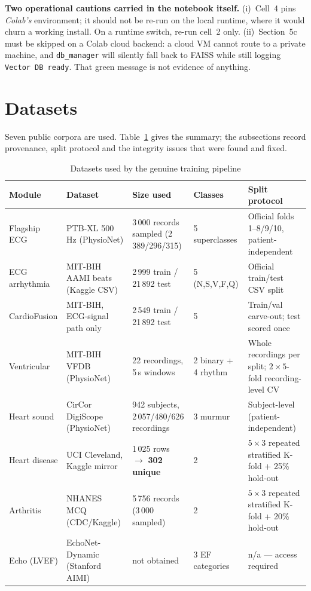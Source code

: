 \documentclass[11pt,a4paper]{article}
\newcommand{\code}[1]{\texttt{\small #1}}
\begin{document}
\begin{notebox}
\textbf{Two operational cautions carried in the notebook itself.}
(i)~Cell~4 pins \emph{Colab's} environment; it should not be re-run on the
local runtime, where it would churn a working install. On a runtime
switch, re-run cell~2 only.
(ii)~Section~5c must be skipped on a Colab cloud backend: a cloud VM
cannot route to a private machine, and \code{db\_manager} will silently
fall back to FAISS while still logging \code{Vector DB ready}. That green
message is not evidence of anything.
\end{notebox}

\section{Datasets}
\label{sec:data}

Seven public corpora are used. Table~\ref{tab:datasets} gives the summary;
the subsections record provenance, split protocol and the integrity
issues that were found and fixed.

\begin{table}[!ht]
\centering
\caption{Datasets used by the genuine training pipeline}
\label{tab:datasets}
\small
\begin{tabular}{@{}p{2.7cm}p{3.4cm}p{2.9cm}p{2.0cm}p{3.0cm}@{}}
\toprule
\textbf{Module} & \textbf{Dataset} & \textbf{Size used} &
\textbf{Classes} & \textbf{Split protocol}\\
\midrule
Flagship ECG & PTB-XL 500\,Hz (PhysioNet) & 3\,000 records sampled
(2\,389/296/315) & 5 superclasses & Official folds 1--8/9/10,
patient-independent\\
\addlinespace
ECG arrhythmia & MIT-BIH AAMI beats (Kaggle CSV) & 2\,999 train /
21\,892 test & 5 (N,S,V,F,Q) & Official train/test CSV split\\
\addlinespace
CardioFusion & MIT-BIH, ECG-signal path only & 2\,549 train /
21\,892 test & 5 & Train/val carve-out; test scored once\\
\addlinespace
Ventricular & MIT-BIH VFDB (PhysioNet) & 22 recordings,
5\,s windows & 2 binary + 4 rhythm & Whole recordings per split;
$2\times5$-fold recording-level CV\\
\addlinespace
Heart sound & CirCor DigiScope (PhysioNet) & 942 subjects,
2\,057/480/626 recordings & 3 murmur & Subject-level
(patient-independent)\\
\addlinespace
Heart disease & UCI Cleveland, Kaggle mirror & 1\,025 rows
$\rightarrow$ \textbf{302 unique} & 2 & $5\times3$ repeated stratified
K-fold + 25\% hold-out\\
\addlinespace
Arthritis & NHANES MCQ (CDC/Kaggle) & 5\,756 records
(3\,000 sampled) & 2 & $5\times3$ repeated stratified K-fold + 20\%
hold-out\\
\addlinespace
Echo (LVEF) & EchoNet-Dynamic (Stanford AIMI) &
\textcolor{dcwarn}{not obtained} & 3 EF categories &
\textcolor{dcwarn}{n/a --- access required}\\
\bottomrule
\end{tabular}
\end{table}
\end{document}
